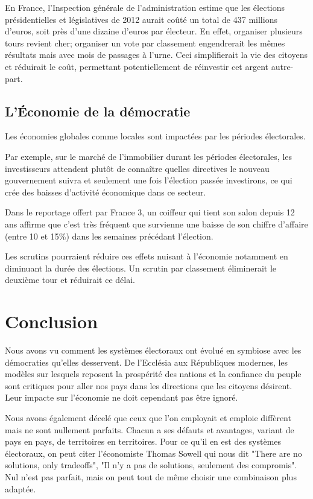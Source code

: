 \documentclass[11pt,a4paper]{report}
\begin{document}
En France, l'Inspection générale de l'administration estime que les élections présidentielles et législatives de 2012 aurait coûté un total de 437 millions d'euros, soit près d'une dizaine d'euros par électeur.\nocite{senat:prixelec2012}
En effet, organiser plusieurs tours revient cher; organiser un vote par classement engendrerait les mêmes résultats mais avec mois de passages à l'urne.
Ceci simplifierait la vie des citoyens et réduirait le coût, permettant potentiellement de réinvestir cet argent autre-part.

\subsection{L'Économie de la démocratie}

Les économies globales comme locales sont impactées par les périodes électorales.

Par exemple, sur le marché de l’immobilier durant les périodes électorales, les investisseurs attendent plutôt de connaître quelles directives le nouveau gouvernement suivra et seulement une fois l'élection passée investirons, ce qui crée des baisses d’activité économique dans ce secteur.

Dans le reportage offert par France 3\nocite{fr3:impact}, un coiffeur qui tient son salon depuis 12 ans affirme que c’est très fréquent que survienne une baisse de son chiffre d’affaire (entre 10 et 15\%) dans les semaines précédant l'élection.

Les scrutins pourraient réduire ces effets nuisant à l'économie notamment en diminuant la durée des élections. Un scrutin par classement éliminerait le deuxième tour et réduirait ce délai.



\newpage
\section*{Conclusion}
Nous avons vu comment les systèmes électoraux ont évolué en symbiose avec les démocraties qu'elles desservent. De l'Ecclésia aux Républiques modernes, les modèles sur lesquels reposent la prospérité des nations et la confiance du peuple sont critiques pour aller nos pays dans les directions que les citoyens désirent. Leur impacte sur l'économie ne doit cependant pas être ignoré.

Nous avons également décelé que ceux que l'on employait et emploie diffèrent mais ne sont nullement parfaits. Chacun a ses défauts et avantages, variant de pays en pays, de territoires en territoires. Pour ce qu'il en est des systèmes électoraux, on peut citer l'économiste Thomas Sowell qui nous dit "There are no solutions, only tradeoffs", "Il n'y a pas de solutions, seulement des compromis". Nul n'est pas parfait, mais on peut tout de même choisir une combinaison plus adaptée.

 

\end{document}
